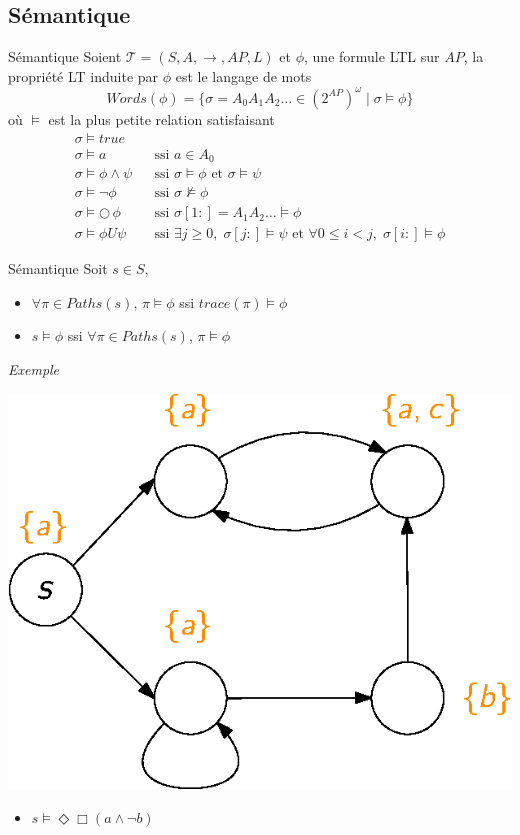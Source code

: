 \documentclass[compress]{beamer}
\begin{document}
\subsection{Sémantique}
\begin{frame}{Sémantique}
\small
Soient $\mathcal{T} = (S, A, \rightarrow, AP, L)$ et $\phi$, une formule LTL sur $AP$, la propriété LT induite par $\phi$ est le langage de mots
\[
  Words(\phi) = \{ \sigma = A_0A_1A_2\dots \in (2^{AP})^\omega \; | \; \sigma \models \phi \}
\]
où $\models$ est la plus petite relation satisfaisant
\begin{align*}
  & \sigma \models true &&& \\
  & \sigma \models a && \text{ssi } a \in A_0& \\
  & \sigma \models \phi \wedge \psi && \text{ssi } \sigma \models \phi \text{ et } \sigma \models \psi& \\
  & \sigma \models \neg\phi && \text{ssi } \sigma \not\models \phi&\\
  & \sigma \models \bigcirc \, \phi && \text{ssi } \sigma[1:] = A_1A_2\dots \models \phi&\\
  & \sigma \models \phi U \psi && \text{ssi } \exists j \geq 0, \; \sigma[j:] \models \psi \text{ et } \forall 0 \leq i < j, \; \sigma[i:] \models \phi
\end{align*}
\end{frame}

\begin{frame}{Sémantique}
\small
Soit $s \in S$,
\begin{itemize}
  \item $\forall \pi \in Paths(s)$, $\pi \models \phi$ ssi $trace(\pi) \models \phi$
  \item $s \models \phi$ ssi $\forall \pi \in Paths(s)$, $\pi \models \phi$
\end{itemize}

\textit{\color{gray}Exemple}
\vspace{-0.02\linewidth}
\begin{center}
\includegraphics[width=0.4\linewidth]{resources/LTL_example2}
\end{center}
\begin{itemize}
  \item $s \models \Diamond\Box (a \wedge \neg b)$
\end{itemize}
\end{frame}
\end{document}
